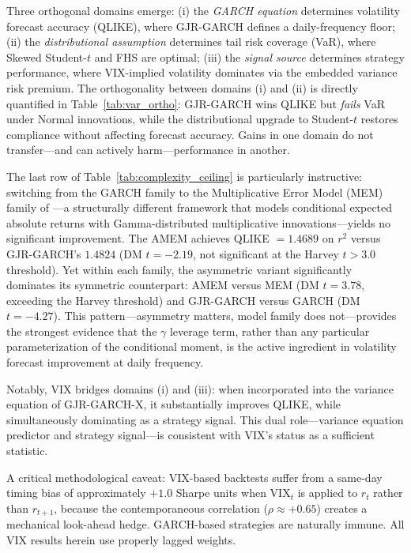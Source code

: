 Three orthogonal domains emerge: (i) the \textit{GARCH equation} determines volatility forecast accuracy (QLIKE), where GJR-GARCH defines a daily-frequency floor; (ii) the \textit{distributional assumption} determines tail risk coverage (VaR), where Skewed Student-$t$ and FHS are optimal; (iii) the \textit{signal source} determines strategy performance, where VIX-implied volatility dominates via the embedded variance risk premium. The orthogonality between domains (i) and (ii) is directly quantified in Table~\ref{tab:var_ortho}: GJR-GARCH wins QLIKE but \textit{fails} VaR under Normal innovations, while the distributional upgrade to Student-$t$ restores compliance without affecting forecast accuracy. Gains in one domain do not transfer---and can actively harm---performance in another.

The last row of Table~\ref{tab:complexity_ceiling} is particularly instructive: switching from the GARCH family to the Multiplicative Error Model (MEM) family of \citet{engle2006}---a structurally different framework that models conditional expected absolute returns with Gamma-distributed multiplicative innovations---yields no significant improvement. The AMEM achieves QLIKE $= 1.4689$ on $r^2$ versus GJR-GARCH's $1.4824$ (DM $t = -2.19$, not significant at the Harvey $t > 3.0$ threshold). Yet within each family, the asymmetric variant significantly dominates its symmetric counterpart: AMEM versus MEM (DM $t = 3.78$, exceeding the Harvey threshold) and GJR-GARCH versus GARCH (DM $t = -4.27$). This pattern---asymmetry matters, model family does not---provides the strongest evidence that the $\gamma$ leverage term, rather than any particular parameterization of the conditional moment, is the active ingredient in volatility forecast improvement at daily frequency.

Notably, VIX bridges domains (i) and (iii): when incorporated into the variance equation of GJR-GARCH-X, it substantially improves QLIKE, while simultaneously dominating as a strategy signal. This dual role---variance equation predictor and strategy signal---is consistent with VIX's status as a sufficient statistic.

A critical methodological caveat: VIX-based backtests suffer from a same-day timing bias of approximately $+1.0$ Sharpe units when $\text{VIX}_t$ is applied to $r_t$ rather than $r_{t+1}$, because the contemporaneous correlation ($\rho \approx +0.65$) creates a mechanical look-ahead hedge. GARCH-based strategies are naturally immune. All VIX results herein use properly lagged weights.

